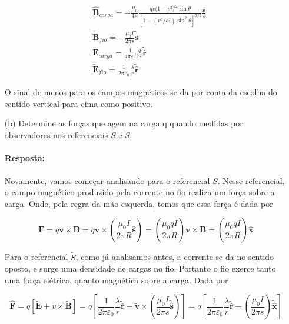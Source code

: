 \documentclass[10pt,a4paper]{article}
\begin{document}
\begin{itemize}
\begin{align*}
&\mathbf{\hat{B}}_{carga}=-\frac{\mu_0}{4\pi}\frac{qv(1-v^2/^2\sin\theta}{[1-(v^2/c^2)\sin^2\theta]^{3/2}}\frac{\mathbf{\tilde{\hat{s}}}}{s}\\
&\mathbf{\tilde{B}}_{fio} = -\frac{\mu_0I}{2\pi s}\mathbf{\tilde{\hat{s}}} \\
&\mathbf{\tilde{E}}_{carga} = \frac{1}{4\pi \varepsilon_0}\frac{q}{r^2}\mathbf{\tilde{\hat{r}}}\\
&\mathbf{\tilde{E}}_{fio} = \frac{1}{2\pi \varepsilon_0}\frac{\lambda}{r}\mathbf{\tilde{\hat{r}}}
\end{align*}

O sinal de menos para os campos magnéticos se da por conta da escolha do sentido vertical para cima como positivo. 
\item[(b)]Determine as forças que agem na carga q quando medidas por observadores nos referenciais $S$ e $\tilde{S}$. 

\paragraph{Resposta:} Novamente, vamos começar analisando para o referencial $S$. Nesse referencial, o campo magnético produzido pela corrente no fio realiza um força  sobre a carga. Onde, pela regra da mão esquerda, temos que essa força é dada por 

\begin{equation*}
	\mathbf{F} = q\mathbf{v}\times\mathbf{B} = q\mathbf{v}\times\left(\frac{\mu_0I}{2\pi R}\mathbf{\hat{s}}\right) = \left(\frac{\mu_0 q I}{2\pi R}\right)\mathbf{v}\times \mathbf{B} = \left(\frac{\mu_0 q I}{2\pi R}\right)\mathbf{\hat{x}}
\end{equation*}

Para o referencial $\tilde{S}$, como já analisamos antes, a corrente se da no sentido oposto, e surge uma densidade de cargas no fio. Portanto o fio exerce tanto uma força elétrica, quanto magnética sobre a carga. Dada por 

\begin{equation*}
\mathbf{\hat{F}} = q[\mathbf{\tilde{E}} + v\times \mathbf{\tilde{B}}] = q\left[\frac{1}{2\pi \varepsilon_0}\frac{\lambda}{r}\mathbf{\tilde{\hat{r}}} - \mathbf{\tilde{v}}\times\left(\frac{\mu_0I}{2\pi s}\mathbf{\tilde{\hat{s}}}\right)\right] = q\left[\frac{1}{2\pi \varepsilon_0}\frac{\lambda}{r}\mathbf{\tilde{\hat{r}}}-\left(\frac{\mu_0 I}{2\pi s}\right)\mathbf{\tilde{\hat{x}}}\right]
\end{equation*}

\end{itemize} 
 
\end{document}
